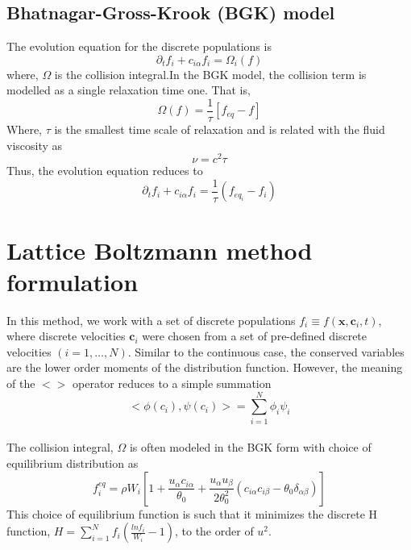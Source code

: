 \documentclass[titlepage,a4paper,10pt]{article}
\begin{document}
\subsection{Bhatnagar-Gross-Krook (BGK) model}
The evolution equation for the discrete populations is 
\begin{equation} \partial_tf_i + c_{i\alpha}f_i = \Omega_i(f) \end{equation}
where, $\Omega$ is the collision integral.In the BGK model, the collision term is modelled as a single relaxation time one. That is,
\begin{equation} \Omega(f) = \frac{1}{\tau}[f_{eq} - f] \end{equation}
Where, $\tau$ is the smallest time scale of relaxation and is related with the fluid viscosity as 
\begin{equation} \nu = c^2\tau \end{equation}
Thus, the evolution equation reduces to  
\begin{equation} \partial_tf_i + c_{i\alpha}f_i = \frac{1}{\tau}(f_{eq}_i - f_i)\end{equation}

\section{Lattice Boltzmann method formulation}
In this method, we work with a set of discrete populations $f_i \equiv f(\textbf{x},\textbf{c}_i,t)$, where discrete velocities $\textbf{c}_i$ were chosen from a set of pre-defined discrete velocities $(i = 1,\hdots, N)$. Similar to the continuous case, the conserved variables are the lower order moments of the distribution function. However, the meaning of the $<>$ operator reduces to a simple summation
\[ <\phi(c_i),\psi(c_i)> = \sum_{i=1}^N\phi_i\psi_i\]
\\
The collision integral, $\Omega$ is often modeled in the BGK form with choice of equilibrium distribution as 
\begin{equation} f_i^{eq} = \rho W_i\left[1 + \frac{u_{\alpha} c_{i\alpha}}{\theta_0} + \frac{u_{\alpha}u_{\beta}}{2\theta_0^2}(c_{i\alpha}c_{i\beta} - \theta_0\delta_{\alpha\beta})\right] \end{equation}
This choice of equilibrium function is such that it minimizes the discrete H function, $H = \sum_{i=1}^N f_i(\frac{lnf_i}{W_i} - 1) $, to the order of $u^2$.
\end{document}
